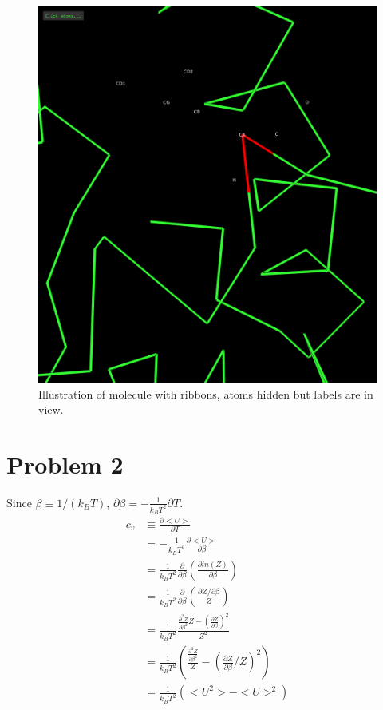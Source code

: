 \documentclass[11pt]{article}
\begin{document}
\begin{figure}[htbp]
\centering
\includegraphics[width=.9\linewidth]{./ribbons.png}
\caption{Illustration of molecule with ribbons, atoms hidden but labels are in view.}
\end{figure}

\section{Problem 2}
\label{sec:org7759e29}
Since \(\beta \equiv 1/(k_{B}T)\), \(\partial \beta = -
\frac{1}{k_{B}T^{2}}\partial T\).
\begin{align}
c_{v}    & \equiv \frac{\partial <U>}{\partial T} \\
        & =  - \frac{1}{k_{B}T^{2}} \frac{\partial <U>}{\partial \beta} \\
        & =  \frac{1}{k_{B}T^{2}} \frac{\partial }{\partial \beta} (\frac{\partial ln(Z)}{\partial \beta}) \\
        & =  \frac{1}{k_{B}T^{2}} \frac{\partial }{\partial \beta} (\frac{\partial Z /\partial \beta}{Z}) \\
 & = \frac{1}{k_{B}T^{2}} \frac{\frac{\partial^{2}Z}{\partial\beta^{2}} Z - (\frac{\partial Z}{\partial\beta})^{2}}{Z^{2}} \\
 & = \frac{1}{k_{B}T^{2}} (\frac{\frac{\partial^{2}Z}{\partial\beta^{2}}}{Z} - (\frac{\partial Z}{\partial \beta} / Z)^{2}) \\
& = \frac{1}{k_{B}T^{2}} (<U^{2}> - <U>^{2})
\end{align}
\end{document}
